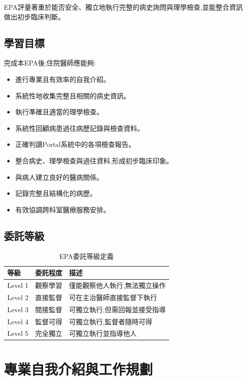 \documentclass[12pt,a4paper]{article}
\newcommand{\note}[1]{
    \par
    \noindent
    \begin{tcolorbox}[
        colback=emergency_blue!5!white,
        colframe=emergency_blue,
        title=\textbf{重點提醒},
        fonttitle=\bfseries,
        boxrule=0.5pt,
        arc=3pt,
        left=6pt,
        right=6pt,
        top=6pt,
        bottom=6pt
    ]
    #1
    \end{tcolorbox}
}
\begin{document}
\vspace{0.5cm}
\note{
EPA評量著重於能否安全、獨立地執行完整的病史詢問與理學檢查,並能整合資訊做出初步臨床判斷。
}

\subsection{學習目標}
完成本EPA後,住院醫師應能夠:
\begin{itemize}[nosep]
    \item 進行專業且有效率的自我介紹。
    \item 系統性地收集完整且相關的病史資訊。
    \item 執行準確且適當的理學檢查。
    \item 系統性回顧病患過往病歷記錄與檢查資料。
    \item 正確判讀Portal系統中的各項檢查報告。
    \item 整合病史、理學檢查與過往資料,形成初步臨床印象。
    \item 與病人建立良好的醫病關係。
    \item 記錄完整且結構化的病歷。
    \item 有效協調跨科室醫療服務安排。
\end{itemize}

\subsection{委託等級}
\begin{table}[h]
    \centering
    \caption{EPA委託等級定義}
    \begin{tabular}{p{2cm} p{3cm} p{9cm}}
        \toprule
        \textbf{等級} & \textbf{委託程度} & \textbf{描述} \\
        \midrule
        Level 1 & 觀察學習 & 僅能觀察他人執行,無法獨立操作 \\
        Level 2 & 直接監督 & 可在主治醫師直接監督下執行 \\
        Level 3 & 間接監督 & 可獨立執行,但需回報並接受指導 \\
        Level 4 & 監督可得 & 可獨立執行,監督者隨時可得 \\
        Level 5 & 完全獨立 & 可獨立執行並指導他人 \\
        \bottomrule
    \end{tabular}
\end{table}

\section{專業自我介紹與工作規劃}
\end{document}
